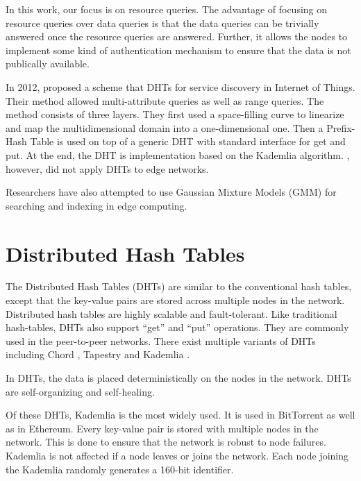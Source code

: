 In this work, our focus is on resource queries. The advantage of focusing on
resource queries over data queries is that the data queries can be trivially
answered once the resource queries are answered. Further, it allows the nodes to
implement some kind of authentication mechanism to ensure that the data is not
publically available.


In 2012, \citet{federicapaganelliDHTBasedDiscoveryService2012} proposed a scheme
that DHTs for service discovery in Internet of Things. Their method allowed
multi-attribute queries as well as range queries. The method consists of three
layers. They first used a space-filling curve to linearize and map the
multidimensional domain into a one-dimensional one. Then a Prefix-Hash Table is
used on top of a generic DHT with standard interface for get and put. At the
end, the DHT is implementation based on the Kademlia algorithm.
\citet{federicapaganelliDHTBasedDiscoveryService2012}, however, did not apply
DHTs to edge networks.

Researchers have also attempted to use Gaussian Mixture Models (GMM) for
searching and indexing in edge computing.


\section{Distributed Hash Tables}

The Distributed Hash Tables (DHTs) are similar to the conventional hash tables,
except that the key-value pairs are stored across multiple nodes in the network.
Distributed hash tables are highly scalable and fault-tolerant. Like traditional
hash-tables, DHTs also support ``get'' and ``put'' operations. They are commonly
used in the peer-to-peer networks. There exist multiple variants of DHTs
including Chord \cite{ChordScalablePeertopeer}, Tapestry
\cite{zhaoTapestryResilientGlobalscale2004} and Kademlia
\cite{petarmaymounkovKademliaPeertoPeerInformation2002}.

In DHTs, the data is placed deterministically on the nodes in the network. DHTs
are self-organizing and self-healing.

Of these DHTs, Kademlia is the most widely used. It is used in BitTorrent
\cite{andrewloewensternDHTProtocol2008} as well as in Ethereum. Every key-value
pair is stored with multiple nodes in the network. This is done to ensure that
the network is robust to node failures. Kademlia is not affected if a node
leaves or joins the network. Each node joining the Kademlia randomly generates a
160-bit identifier.
\cite{petarmaymounkovKademliaPeertoPeerInformation2002}

